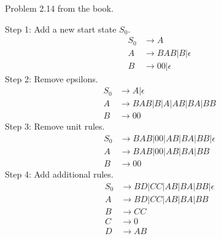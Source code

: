 \begin{problem}{4}
  Problem 2.14 from the book.
  \begin{solution}
    Step 1: Add a new start state $S_0$.
    \begin{align*}
      S_0 &\rightarrow A \\
      A &\rightarrow BAB|B|\epsilon \\
      B &\rightarrow 00|\epsilon
    \end{align*}
    Step 2: Remove epsilons.
    \begin{align*}
      S_0 &\rightarrow A | \epsilon \\
      A &\rightarrow BAB|B|A|AB|BA|BB \\
      B &\rightarrow 00
    \end{align*}
    Step 3: Remove unit rules.
    \begin{align*}
      S_0 &\rightarrow BAB|00|AB|BA|BB| \epsilon \\
      A &\rightarrow BAB|00|AB|BA|BB \\
      B &\rightarrow 00
    \end{align*}
    Step 4: Add additional rules.
    \begin{align*}
      S_0 &\rightarrow BD|CC|AB|BA|BB| \epsilon \\
      A &\rightarrow BD|CC|AB|BA|BB \\
      B &\rightarrow CC \\
      C &\rightarrow 0 \\
      D &\rightarrow AB
    \end{align*}
  \end{solution}
\end{problem}

\begin{problem}{5}
\end{problem}

\begin{problem}{6}
\end{problem}

\begin{problem}{7}
\end{problem}

\begin{problem}{8}
\end{problem}

\begin{problem}{9}
\end{problem}




